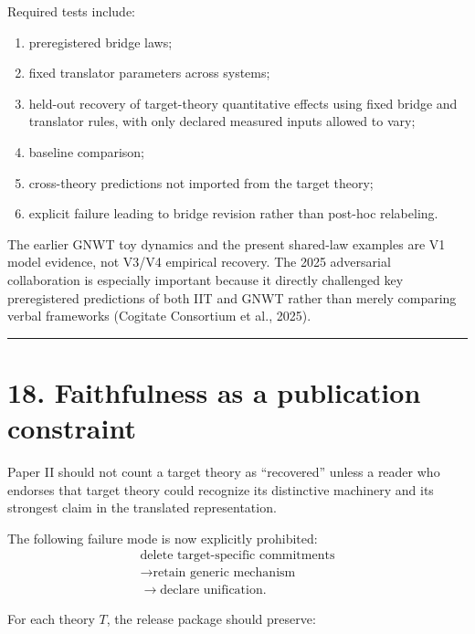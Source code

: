 \documentclass[
  11pt,
  a4paper,
]{article}
\providecommand{\tightlist}{%
  \setlength{\itemsep}{0pt}\setlength{\parskip}{0pt}}
\begin{document}
Required tests include:

\begin{enumerate}
\def\labelenumi{\arabic{enumi}.}
\tightlist
\item
  preregistered bridge laws;
\item
  fixed translator parameters across systems;
\item
  held-out recovery of target-theory quantitative effects using fixed
  bridge and translator rules, with only declared measured inputs
  allowed to vary;
\item
  baseline comparison;
\item
  cross-theory predictions not imported from the target theory;
\item
  explicit failure leading to bridge revision rather than post-hoc
  relabeling.
\end{enumerate}

The earlier GNWT toy dynamics and the present shared-law examples are V1
model evidence, not V3/V4 empirical recovery. The 2025 adversarial
collaboration is especially important because it directly challenged key
preregistered predictions of both IIT and GNWT rather than merely
comparing verbal frameworks (Cogitate Consortium et al., 2025).

\begin{center}\rule{0.5\linewidth}{0.5pt}\end{center}

\hypertarget{faithfulness-as-a-publication-constraint}{%
\section{18. Faithfulness as a publication
constraint}\label{faithfulness-as-a-publication-constraint}}

Paper II should not count a target theory as ``recovered'' unless a
reader who endorses that target theory could recognize its distinctive
machinery and its strongest claim in the translated representation.

The following failure mode is now explicitly prohibited:
\nopagebreak[4]
\[
\begin{gathered}
\text{delete target-specific commitments}\\
\longrightarrow\text{retain generic mechanism}\\
\longrightarrow\text{declare unification}.
\end{gathered}
\]

For each theory \(T\), the release package should preserve:
\end{document}
